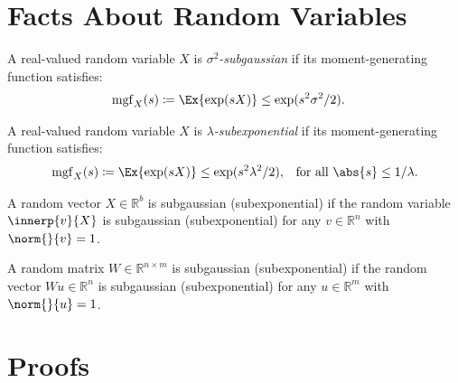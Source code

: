\documentclass{article}
\newcommand{\defeq}{\coloneq}
\newcommand{\Real}{\mathds{R}}
\newcommand{\mgf}{\mathrm{mgf}}
\DeclarePairedDelimiter{\abs}||
\begin{document}
\appendix

\section{Facts About Random Variables}

\begin{definition}\label{def:subG}
  A real-valued random variable $X$ is \emph{$\sigma^2$-subgaussian}
  if its moment-generating function satisfies:
  \begin{align*}
    \mgf_X(s) \defeq \Ex{\exp(sX)} &\le \exp(s^2\sigma^2/2).
  \end{align*}
\end{definition}

\begin{definition}\label{def:subExp}
  A real-valued random variable $X$ is \emph{$\lambda$-subexponential}
  if its moment-generating function satisfies:
  \begin{align*}
    \mgf_X(s) \defeq \Ex{\exp(sX)} &\le \exp(s^2\lambda^2/2),
    &\text{for all } \abs{s}\le 1/\lambda.
  \end{align*}
\end{definition}

\begin{definition}
  A random vector $X\in\Real^b$ is subgaussian (subexponential) if the
  random variable $\innerp{v}{X}$ is subgaussian (subexponential) for
  any $v\in\Real^n$ with $\norm{}{v}=1$.
\end{definition}

\begin{definition}
  A random matrix $W\in\Real^{n\times m}$ is subgaussian (subexponential)
  if the random vector $Wu\in\Real^n$ is subgaussian
  (subexponential) for any $u\in\Real^m$ with $\norm{}{u}=1$.
\end{definition}

\section{Proofs}
\end{document}

